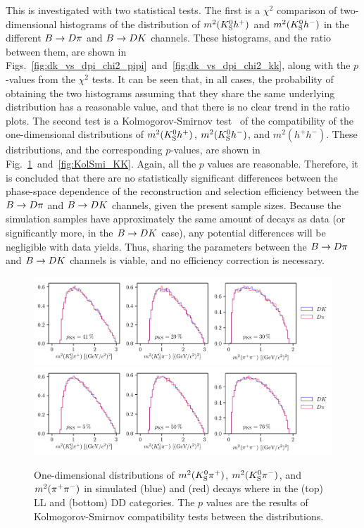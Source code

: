 This is investigated with two statistical tests. The first is a $\chi^2$ comparison of two-dimensional histograms of the distribution of $m^2({{K}^0_{\mathrm{S}}} h^+)$ and $m^2({{K}^0_{\mathrm{S}}} h^-)$ in the different ${B}\rightarrow{\ensuremath{D}}\pi$ and ${B}\rightarrow{\ensuremath{D}}{\ensuremath{K}}$ channels. These histograms, and the ratio between them, are shown in Figs.~\ref{fig:dk_vs_dpi_chi2_pipi}~and~\ref{fig:dk_vs_dpi_chi2_kk}, along with the $p$-values from the $\chi^2$ tests. It can be seen that, in all cases, the probability of obtaining the two histograms assuming that they share the same underlying distribution has a reasonable value, and that there is no clear trend in the ratio plots. The second test is a Kolmogorov-Smirnov test~\cite{kolmogorovSullaDeterminazioneEmpirica1933,*smirnovTableEstimatingGoodness1948} of the compatibility of the one-dimensional distributions of $m^2({{K}^0_{\mathrm{S}}} h^+)$, $m^2({{K}^0_{\mathrm{S}}} h^-)$, and $m^2(h^+ h^-)$. These distributions, and the corresponding $p$-values, are shown in Fig.~\ref{fig:KolSmi_PiPi}~and~\ref{fig:KolSmi_KK}. Again, all the $p$ values are reasonable. Therefore, it is concluded that there are no statistically significant differences between the phase-space dependence of the reconstruction and selection efficiency between the ${B}\rightarrow{\ensuremath{D}}\pi$ and ${B}\rightarrow{\ensuremath{D}}{\ensuremath{K}}$ channels, given the present sample sizes. Because the simulation samples have approximately the same amount of decays as data (or significantly more, in the ${B}\rightarrow{\ensuremath{D}}{\ensuremath{K}}$ case), any potential differences will be negligible with data yields. Thus, sharing the \Fi parameters between the ${B}\rightarrow{\ensuremath{D}}\pi$ and ${B}\rightarrow{\ensuremath{D}}{\ensuremath{K}}$ channels is viable, and no efficiency correction is necessary. 

\begin{figure}[tbp]
    \centering
    \includegraphics[width=\columnwidth]{figures/analysis/DP_thesis_s_KolSmi_PiPi_LL.pdf}
    \includegraphics[width=\columnwidth]{figures/analysis/DP_thesis_s_KolSmi_PiPi_DD.pdf}
    \caption{One-dimensional distributions of $m^2({{K}^0_{\mathrm{S}}}{{\pi}^+})$, $m^2({{K}^0_{\mathrm{S}}}{{\pi}^-})$, and $m^2({{\pi}^+}{{\pi}^-})$ in simulated (blue) \BtoDK and (red) \BtoDpi  decays where \DtoKspipi in the (top) LL and (bottom) DD categories. The $p$ values are the results of Kolmogorov-Smirnov compatibility tests between the distributions.}
    \label{fig:KolSmi_PiPi}
\end{figure}


